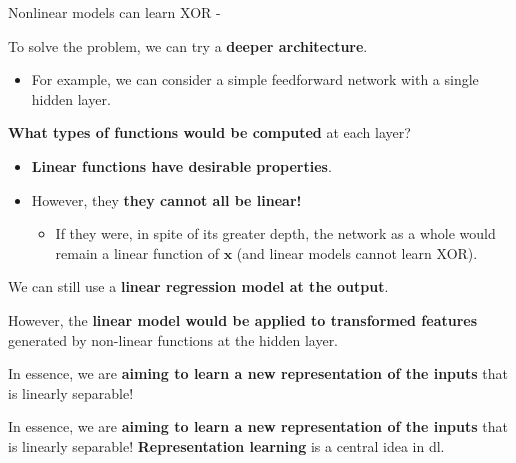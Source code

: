 %
%
%

\begin{frame}[t,allowframebreaks]{Nonlinear models can learn XOR -} 

    To solve the problem, we can try a {\bf deeper architecture}.
    \begin{itemize}
        \item 
        For example, we can consider a simple feedforward network 
        with a single hidden layer.\\
    \end{itemize}
    \vspace{0.2cm}

    {\bf What types of functions would be computed} at each layer?\\
    \begin{itemize}
    \item
        {\bf Linear functions have desirable properties}.
    \item
        However, they {\bf they cannot all be linear!}    
        \begin{itemize}
            \item 
            If they were, in spite of its greater depth, 
            the network as a whole would remain a linear function of $\mathbf{x}$
            (and linear models cannot learn XOR).
        \end{itemize}
    \end{itemize}
    \vspace{0.2cm}

    We can still use a {\bf linear regression model at the output}.\\
    \vspace{0.2cm}

    However, the {\bf linear model would be applied to transformed features} 
    generated by non-linear functions at the hidden layer.\\
    \vspace{0.2cm}

    In essence, we are {\bf aiming to learn a new representation of the inputs}
    that is linearly separable!\\

    \framebreak

    In essence, we are {\bf aiming to learn a new representation of the inputs}
    that is linearly separable!
    {\bf Representation learning} is a central idea in \gls{dl}.\\


\end{frame}
